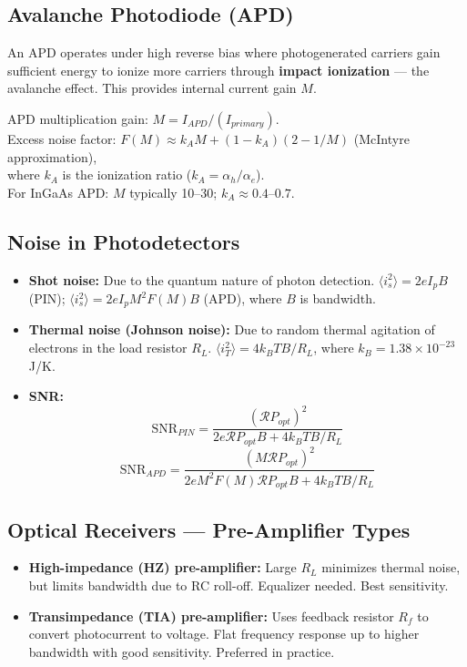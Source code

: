 \documentclass[12pt,a4paper]{article}
\begin{document}
\subsection{Avalanche Photodiode (APD)}
An APD operates under high reverse bias where photogenerated carriers gain sufficient energy to ionize more carriers through \textbf{impact ionization} --- the avalanche effect. This provides internal current gain $M$.

\begin{tcolorbox}[formulabox, title={\textbf{APD Gain, Noise, and SNR}}]
APD multiplication gain: $M = I_{APD}/(I_{primary})$. \\
Excess noise factor: $F(M) \approx k_A M + (1 - k_A)(2 - 1/M)$ (McIntyre approximation), \\
where $k_A$ is the ionization ratio ($k_A = \alpha_h/\alpha_e$). \\
For InGaAs APD: $M$ typically 10--30; $k_A \approx 0.4$--$0.7$.
\end{tcolorbox}

\subsection{Noise in Photodetectors}
\begin{itemize}[leftmargin=*, itemsep=3pt]
  \item \textbf{Shot noise:} Due to the quantum nature of photon detection. $\langle i_s^2 \rangle = 2eI_p B$ (PIN); $\langle i_s^2 \rangle = 2eI_p M^2 F(M) B$ (APD), where $B$ is bandwidth.
  \item \textbf{Thermal noise (Johnson noise):} Due to random thermal agitation of electrons in the load resistor $R_L$. $\langle i_T^2 \rangle = 4k_B T B / R_L$, where $k_B = 1.38\times10^{-23}$\,J/K.
  \item \textbf{SNR:}
\[
\text{SNR}_{PIN} = \frac{(\mathcal{R} P_{opt})^2}{2e\mathcal{R} P_{opt} B + 4k_B T B/R_L}
\]
\[
\text{SNR}_{APD} = \frac{(M\mathcal{R} P_{opt})^2}{2eM^2 F(M)\mathcal{R} P_{opt} B + 4k_B T B/R_L}
\]
\end{itemize}

\subsection{Optical Receivers --- Pre-Amplifier Types}
\begin{itemize}[leftmargin=*, itemsep=3pt]
  \item \textbf{High-impedance (HZ) pre-amplifier:} Large $R_L$ minimizes thermal noise, but limits bandwidth due to RC roll-off. Equalizer needed. Best sensitivity.
  \item \textbf{Transimpedance (TIA) pre-amplifier:} Uses feedback resistor $R_f$ to convert photocurrent to voltage. Flat frequency response up to higher bandwidth with good sensitivity. Preferred in practice.
\end{itemize}
\end{document}
